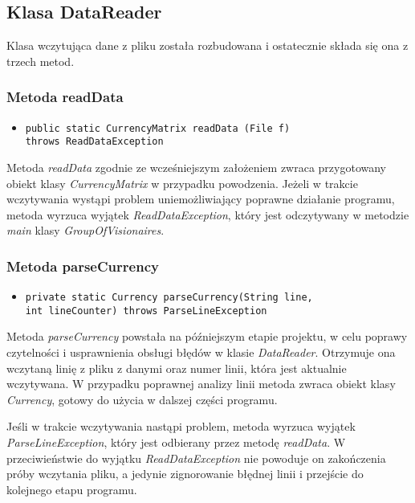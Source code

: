 \documentclass[a4paper,12pt]{article}
\newcommand\tab[1][0.6cm]{\hspace*{#1}}
\begin{document}
\subsection{Klasa DataReader}

\tab Klasa wczytująca dane z pliku została rozbudowana i ostatecznie składa się ona z trzech metod.

\subsubsection{Metoda readData}

\begin{itemize}
\item \begin{lstlisting}
public static CurrencyMatrix readData (File f)
throws ReadDataException
\end{lstlisting}
\end{itemize}

\tab Metoda \textit{readData} zgodnie ze wcześniejszym założeniem zwraca przygotowany obiekt klasy \textit{CurrencyMatrix} w przypadku powodzenia. Jeżeli w trakcie wczytywania wystąpi problem uniemożliwiający poprawne działanie programu, metoda wyrzuca wyjątek \textit{ReadDataException}, który jest odczytywany w metodzie \textit{main} klasy \textit{GroupOfVisionaires}.

\subsubsection{Metoda parseCurrency}

\begin{itemize}
\item \begin{lstlisting}
private static Currency parseCurrency(String line,
int lineCounter) throws ParseLineException
\end{lstlisting}
\end{itemize}

\tab Metoda \textit{parseCurrency} powstała na późniejszym etapie projektu, w celu poprawy czytelności i usprawnienia obsługi błędów w klasie \textit{DataReader}. Otrzymuje ona wczytaną linię z pliku z danymi oraz numer linii, która jest aktualnie wczytywana. W przypadku poprawnej analizy linii metoda zwraca obiekt klasy \textit{Currency}, gotowy do użycia w dalszej części programu. 

Jeśli w trakcie wczytywania nastąpi problem, metoda wyrzuca wyjątek \textit{ParseLineException}, który jest odbierany przez metodę \textit{readData}. W przeciwieństwie do wyjątku \textit{ReadDataException} nie powoduje on zakończenia próby wczytania pliku, a jedynie zignorowanie błędnej linii i przejście do kolejnego etapu programu.
\end{document}
